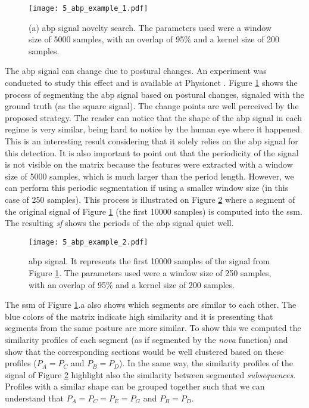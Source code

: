 {\begin{figure}
    \centering
    \texttt{[image: 5\_abp\_example\_1.pdf]}
    \caption{(a) \gls{abp} signal novelty search. The parameters used were a window size of 5000 samples, with an overlap of 95\% and a kernel size of 200 samples.}
    \label{fig:example2}
\end{figure}

The \gls{abp} signal can change due to postural changes. An experiment was conducted to study this effect and is available at Physionet \cite{tilt, PhysioNet}. Figure \ref{fig:example2} shows the process of segmenting the \gls{abp} signal based on postural changes, signaled with the ground truth (as the square signal). The change points are well perceived by the proposed strategy. The reader can notice that the shape of the \gls{abp} signal in each regime is very similar, being hard to notice by the human eye where it happened. This is an interesting result considering that it solely relies on the \gls{abp} signal for this detection. It is also important to point out that the periodicity of the signal is not visible on the matrix because the features were extracted with a window size of 5000 samples, which is much larger than the period length. However, we can perform this periodic segmentation if using a smaller window size (in this case of 250 samples). This process is illustrated on Figure \ref{fig:example2_periodic} where a segment of the original signal of Figure \ref{fig:example2} (the first 10000 samples) is computed into the \gls{ssm}. The resulting \textit{sf} shows the periods of the \gls{abp} signal quiet well.

\begin{figure}
    \centering
    \texttt{[image: 5\_abp\_example\_2.pdf]}
    \caption{\gls{abp} signal. It represents the first 10000 samples of the signal from Figure \ref{fig:example2}. The parameters used were a window size of 250 samples, with an overlap of 95\% and a kernel size of 200 samples.}
    \label{fig:example2_periodic}
\end{figure}

The \gls{ssm} of Figure \ref{fig:example2}.a also shows which segments are similar to each other. The blue colors of the matrix indicate high similarity and it is presenting that segments from the same posture are more similar. To show this we computed the similarity profiles of each segment (as if segmented by the \textit{nova} function) and show that the corresponding sections would be well clustered based on these profiles ($P_A = P_C$ and $P_B=P_D$). In the same way, the similarity profiles of the signal of Figure \ref{fig:example2_periodic} highlight also the similarity between segmented \textit{subsequences}. Profiles with a similar shape can be grouped together such that we can understand that $P_A=P_C=P_E=P_G$ and $P_B=P_D$.

}
